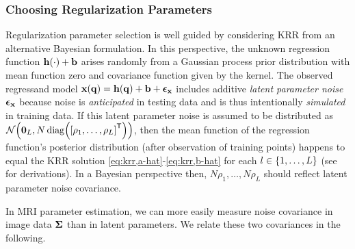 
\subsubsection{Choosing Regularization Parameters}
\label{sss,krr,pract,mod,rho}

Regularization parameter selection is well guided
by considering KRR from an alternative Bayesian formulation.
In this perspective,
the unknown regression function
$\bmh\paren{\cdot}+\bmb$ arises randomly 
from a Gaussian process prior distribution
with mean function zero
and covariance function
given by the kernel.
The observed regressand model
$\bmx\paren{\bmq} = \bmh\paren{\bmq}+\bmb + \bmeps_\bmx$
includes additive \emph{latent parameter noise} $\boldsymbol{\epsilon}_{\mathbf{x}}$ 
because noise is \emph{anticipated} in testing data
and is thus intentionally \emph{simulated} in training data.
If this latent parameter noise is assumed 
to be distributed as 
$\gauss{\zeros{L}}{N\diag{\brac{\rho_1,\dots,\rho_L}\tpose}}$,
then the mean function
of the regression function's posterior distribution
(after observation of training points)
happens to equal the KRR solution 
\eqref{eq:krr,a-hat}-\eqref{eq:krr,b-hat}
for each $l \in \set{1,\dots,L}$
(see \cite[Ch.~2]{rasmussen:05:gpf} for derivations).
In a Bayesian perspective then,
$N\rho_1,\dots,N\rho_L$ should reflect
latent parameter noise covariance.

In MRI parameter estimation,
we can more easily measure noise covariance
in image data $\boldsymbol{\Sigma}$ 
than in latent parameters. 
We relate these two covariances
in the following.

